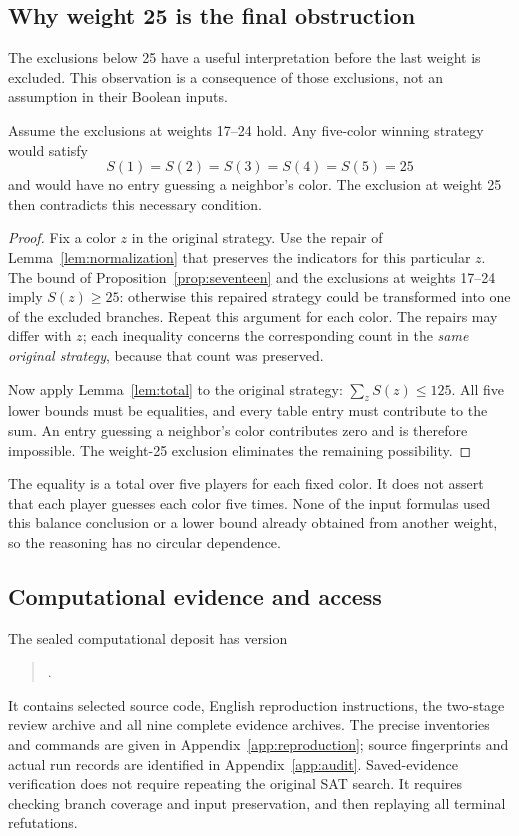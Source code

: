 \subsection{Why weight 25 is the final obstruction}
The exclusions below 25 have a useful interpretation before the last
weight is excluded. This observation is a consequence of those exclusions,
not an assumption in their Boolean inputs.

\begin{corollary}\label{cor:balance}
Assume the exclusions at weights 17--24 hold. Any five-color winning
strategy would satisfy
\[
S(1)=S(2)=S(3)=S(4)=S(5)=25
\]
and would have no entry guessing a neighbor's color. The exclusion at
weight 25 then contradicts this necessary condition.
\end{corollary}
\begin{proof}
Fix a color $z$ in the original strategy. Use the repair of
Lemma~\ref{lem:normalization} that preserves the indicators for this
particular $z$. The bound of Proposition~\ref{prop:seventeen} and the
exclusions at weights 17--24 imply $S(z)\geq25$: otherwise this repaired
strategy could be transformed into one of the excluded branches.
Repeat this argument for each color. The repairs may differ with $z$;
each inequality concerns the corresponding count in the \emph{same
original strategy}, because that count was preserved.

Now apply Lemma~\ref{lem:total} to the original strategy:
$\sum_z S(z)\leq125$. All five lower bounds must be equalities, and every
table entry must contribute to the sum. An entry guessing a neighbor's
color contributes zero and is therefore impossible. The weight-25
exclusion eliminates the remaining possibility.
\end{proof}

The equality is a total over five players for each fixed color. It does
not assert that each player guesses each color five times. None of the
input formulas used this balance conclusion or a lower bound already
obtained from another weight, so the reasoning has no circular dependence.

\subsection{Computational evidence and access}
The sealed computational deposit has version
\begin{quote}\small\raggedright
{}.
\end{quote}
It contains selected source code,
English reproduction instructions, the two-stage review archive and all
nine complete evidence archives. The precise inventories and commands
are given in Appendix~\ref{app:reproduction}; source fingerprints and
actual run records are identified in Appendix~\ref{app:audit}.
Saved-evidence verification does not require repeating the original SAT
search. It requires checking branch coverage and input preservation, and
then replaying all terminal refutations.

